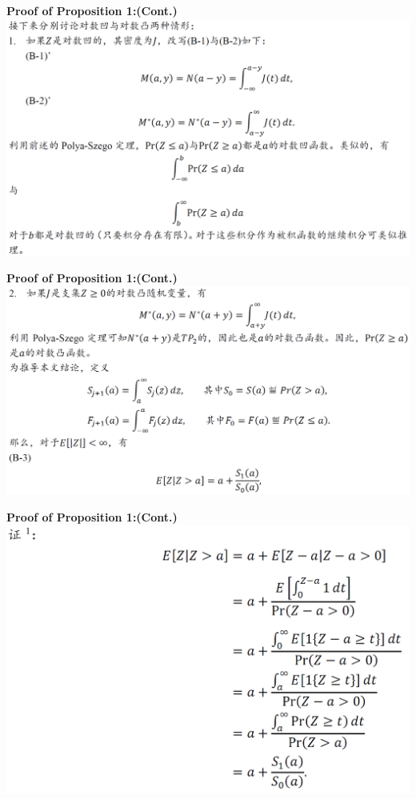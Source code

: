 \documentclass{beamer}
\begin{document}
\begin{frame}
	\textbf{Proof of Proposition 1:(Cont.)}
	\includegraphics[scale=0.5]{proposition1_4}
\end{frame}
\begin{frame}
	\textbf{Proof of Proposition 1:(Cont.)}
	\includegraphics[scale=0.5]{proposition1_5}
\end{frame}
\begin{frame}
	\textbf{Proof of Proposition 1:(Cont.)}
	\includegraphics[scale=0.5]{proposition1_6}
\end{frame}
\end{document}
